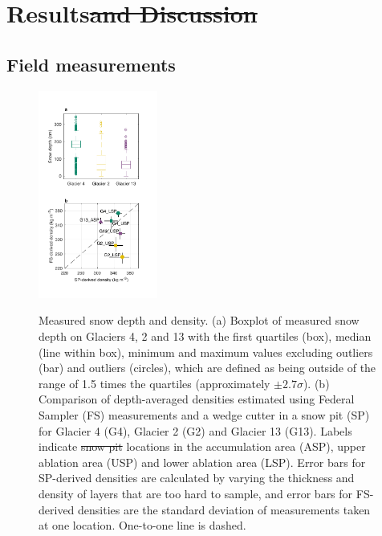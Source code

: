 \documentclass[review,oneside, letterpaper]{igs} %
\providecommand{\DIFadd}[1]{{\protect\color{blue}\uwave{#1}}} %
\providecommand{\DIFdel}[1]{{\protect\color{red}\sout{#1}}}                      %
\providecommand{\DIFdelbegin}{} %
\providecommand{\DIFdelend}{} %
\providecommand{\DIFaddFL}[1]{\DIFadd{#1}} %
\providecommand{\DIFdelFL}[1]{\DIFdel{#1}} %
\providecommand{\DIFaddbeginFL}{} %
\providecommand{\DIFaddendFL}{} %
\providecommand{\DIFdelbeginFL}{} %
\providecommand{\DIFdelendFL}{} %
\newcommand{\DIFscaledelfig}{0.5}
\newlength{\DIFdelgraphicswidth} %
\newlength{\DIFdelgraphicsheight} %
\newcommand{\DIFaddincludegraphics}[2][]{{\color{blue}\fbox{\DIFOincludegraphics[#1]{#2}}}} %
\newcommand{\DIFdelincludegraphics}[2][]{%
\sbox{\DIFdelgraphicsbox}{\DIFOincludegraphics[#1]{#2}}%
\settoboxwidth{\DIFdelgraphicswidth}{\DIFdelgraphicsbox} %
\settoboxtotalheight{\DIFdelgraphicsheight}{\DIFdelgraphicsbox} %
\scalebox{\DIFscaledelfig}{%
\parbox[b]{\DIFdelgraphicswidth}{\usebox{\DIFdelgraphicsbox}\\[-\baselineskip] \rule{\DIFdelgraphicswidth}{0em}}\llap{\resizebox{\DIFdelgraphicswidth}{\DIFdelgraphicsheight}{%
\setlength{\unitlength}{\DIFdelgraphicswidth}%
\begin{picture}(1,1)%
\thicklines\linethickness{2pt} %
{\color[rgb]{1,0,0}\put(0,0){\framebox(1,1){}}}%
{\color[rgb]{1,0,0}\put(0,0){\line( 1,1){1}}}%
{\color[rgb]{1,0,0}\put(0,1){\line(1,-1){1}}}%
\end{picture}%
}\hspace*{3pt}}} %
} %
\DeclareRobustCommand{\DIFdelbegin}{\DIFOdelbegin \let\includegraphics\DIFdelincludegraphics} %
\DeclareRobustCommand{\DIFdelend}{\DIFOaddend \let\includegraphics\DIFOincludegraphics} %
\DeclareRobustCommand{\DIFaddbeginFL}{\DIFOaddbeginFL \let\includegraphics\DIFaddincludegraphics} %
\DeclareRobustCommand{\DIFaddendFL}{\DIFOaddendFL \let\includegraphics\DIFOincludegraphics} %
\DeclareRobustCommand{\DIFdelbeginFL}{\DIFOdelbeginFL \let\includegraphics\DIFdelincludegraphics} %
\DeclareRobustCommand{\DIFdelendFL}{\DIFOaddendFL \let\includegraphics\DIFOincludegraphics} %
\begin{document}
\section{Results\DIFdelbegin \DIFdel{and Discussion}\DIFdelend }

\subsection{Field measurements}

\begin{figure}
	\centering
	\includegraphics[width =0.35\textwidth]{DepthBoxplot_SPvsFS.pdf}\\
	\caption{Measured snow depth and density. (a) Boxplot of measured snow depth on Glaciers 4, 2 and 13 with the first quartiles (box), median (line within box), minimum and maximum values excluding outliers (bar) and outliers (circles), which are defined as being outside of the range of 1.5 times the quartiles (approximately $\pm2.7\sigma$). (b) Comparison of depth-averaged densities estimated using Federal Sampler (FS) measurements and  a wedge cutter in a snow pit (SP)  for Glacier 4 (G4), Glacier 2 (G2) and Glacier 13 (G13). Labels indicate \DIFdelbeginFL \DIFdelFL{snow pit }\DIFdelendFL \DIFaddbeginFL \DIFaddFL{SP }\DIFaddendFL locations in the accumulation area (ASP), upper ablation area (USP) and lower ablation area (LSP). Error bars for SP-derived densities are calculated by varying the thickness and density of layers that are too hard to sample, and error bars for FS-derived densities are the standard deviation of measurements taken at one location. One-to-one line is dashed.}
	\label{fig:DepthBoxplot_SPvsFS}
\end{figure}
\end{document}
